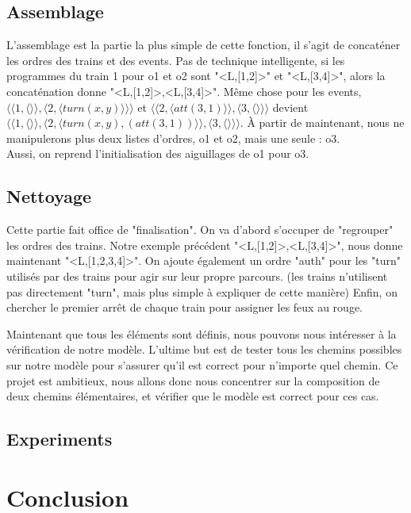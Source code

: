 \documentclass[runningheads]{llncs}
\newcommand{\tuple}[1]{\ensuremath{\langle #1\rangle}}
\begin{document}
\subsection{Assemblage}
L'assemblage est la partie la plus simple de cette fonction, il s'agit de concaténer les ordres des trains et des events.
Pas de technique intelligente, si les programmes du train 1 pour o1 et o2 sont "<L,[1,2]>" et "<L,[3,4]>", alors la concaténation donne "<L,[1,2]>,<L,[3,4]>".
Même chose pour les events, \tuple{\tuple{1,\tuple{}},\tuple{2,\tuple{turn(x,y)}}} et \tuple{\tuple{2,\tuple{att(3,1)}},\tuple{3,\tuple{}}} devient \tuple{\tuple{1,\tuple{}},\tuple{2,\tuple{turn(x,y),(att(3,1))}},\tuple{3,\tuple{}}}.
À partir de maintenant, nous ne manipulerons plus deux listes d'ordres, o1 et o2, mais une seule : o3. 
\\Aussi, on reprend l'initialisation des aiguillages de o1 pour o3.

\subsection{Nettoyage}
Cette partie fait office de "finalisation". On va d'abord s'occuper de "regrouper" les ordres des trains. Notre exemple précédent "<L,[1,2]>,<L,[3,4]>", nous donne maintenant "<L,[1,2,3,4]>". 
On ajoute également un ordre "auth" pour les "turn" utilisés par des trains pour agir sur leur propre parcours. (les trains n'utilisent pas directement "turn", mais plus simple à expliquer de cette manière)
Enfin, on chercher le premier arrêt de chaque train pour assigner les feux au rouge.

Maintenant que tous les éléments sont définis, nous pouvons nous intéresser à la vérification de notre modèle.
L'ultime but est de tester tous les chemins possibles sur notre modèle pour s'assurer qu'il est correct pour n'importe quel chemin.
Ce projet est ambitieux, nous allons donc nous concentrer sur la composition de deux chemins élémentaires, et vérifier que le modèle est correct pour ces cas.


\subsection{Experiments}
\label{sec:experiments:4}


\section{Conclusion}
\label{sec:conclusion}
\end{document}
